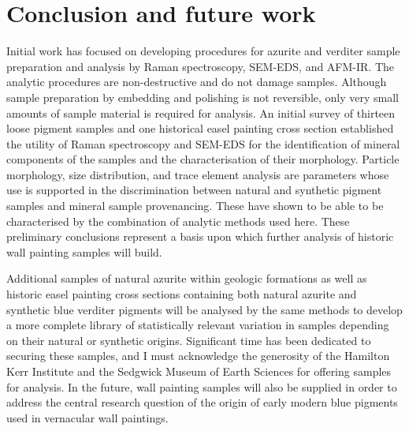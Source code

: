 



\chapter{Conclusion and future work} %

Initial work has focused on developing procedures for azurite and verditer sample preparation and analysis by Raman spectroscopy, SEM-EDS, and AFM-IR. The analytic procedures are non-destructive and do not damage samples. Although sample preparation by embedding and polishing is not reversible, only very small amounts of sample material is required for analysis. An initial survey of thirteen loose pigment samples and one historical easel painting cross section established the utility of Raman spectroscopy and SEM-EDS for the identification of mineral components of the samples and the characterisation of their morphology. Particle morphology, size distribution, and trace element analysis are parameters whose use is supported in the discrimination between natural and synthetic pigment samples and mineral sample provenancing. These have shown to be able to be characterised by the combination of analytic methods used here. These preliminary conclusions represent a basis upon which further analysis of historic wall painting samples will build.

Additional samples of natural azurite within geologic formations as well as historic easel painting cross sections containing both natural azurite and synthetic blue verditer pigments will be analysed by the same methods to develop a more complete library of statistically relevant variation in samples depending on their natural or synthetic origins. Significant time has been dedicated to securing these samples, and I must acknowledge the generosity of the Hamilton Kerr Institute and the Sedgwick Museum of Earth Sciences for offering samples for analysis. In the future, wall painting samples will also be supplied in order to address the central research question of the origin of early modern blue pigments used in vernacular wall paintings. 

